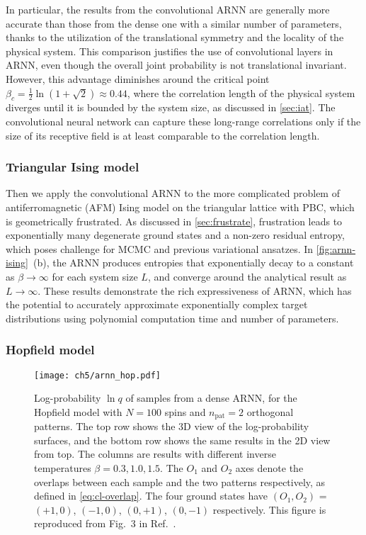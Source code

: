 In particular, the results from the convolutional ARNN are generally more accurate than those from the dense one with a similar number of parameters, thanks to the utilization of the translational symmetry and the locality of the physical system. This comparison justifies the use of convolutional layers in ARNN, even though the overall joint probability is not translational invariant. However, this advantage diminishes around the critical point $\beta_c = \frac{1}{2} \ln(1 + \sqrt{2}) \approx 0.44$, where the correlation length of the physical system diverges until it is bounded by the system size, as discussed in \cref{sec:iat}. The convolutional neural network can capture these long-range correlations only if the size of its receptive field is at least comparable to the correlation length.

\subsubsection{Triangular Ising model}
\label{sec:arnn-tri-ising}

Then we apply the convolutional ARNN to the more complicated problem of antiferromagnetic (AFM) Ising model on the triangular lattice with PBC, which is geometrically frustrated. As discussed in \cref{sec:frustrate}, frustration leads to exponentially many degenerate ground states and a non-zero residual entropy, which poses challenge for MCMC and previous variational ansatzes. In \cref{fig:arnn-ising}~(b), the ARNN produces entropies that exponentially decay to a constant as $\beta \to \infty$ for each system size $L$, and converge around the analytical result as $L \to \infty$. These results demonstrate the rich expressiveness of ARNN, which has the potential to accurately approximate exponentially complex target distributions using polynomial computation time and number of parameters.

\subsubsection{Hopfield model}
\label{sec:arnn-hop}

\begin{figure}[htb]
\centering
\texttt{[image: ch5/arnn\_hop.pdf]}
\caption[ARNN results of Hopfield model]{
Log-probability $\ln q$ of samples from a dense ARNN, for the Hopfield model with $N = 100$ spins and $n_\text{pat} = 2$ orthogonal patterns.
The top row shows the 3D view of the log-probability surfaces, and the bottom row shows the same results in the 2D view from top.
The columns are results with different inverse temperatures $\beta = 0.3, 1.0, 1.5$.
The $O_1$ and $O_2$ axes denote the overlaps between each sample and the two patterns respectively, as defined in \cref{eq:cl-overlap}.
The four ground states have $(O_1, O_2)$ = $(+1, 0)$, $(-1, 0)$, $(0, +1)$, $(0, -1)$ respectively.
This figure is reproduced from Fig.~3 in Ref.~\cite{wu2019solving}.
}
\label{fig:arnn-hop}
\end{figure}

